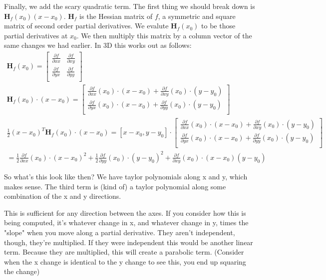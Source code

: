 \documentclass[12pt, letterpaper]{article}
\begin{document}
Finally, we add the scary quadratic term. The first thing we should break down is $\mathbf{H}_f(x_0)(x-x_0)$. $\mathbf{H}_f$ is the Hessian matrix of $f$, a symmetric and square matrix of second order partial derivatives.
We evalute $\mathbf{H}_f(x_0)$ to be those partial derivatives at $x_0$. We then multiply this matrix by a column vector of the same changes we had earlier. In 3D this works out as follows:
\begin{gather*}
    \mathbf{H}_f(x_0) = \begin{bmatrix}
        \frac{\partial f}{\partial xx} & \frac{\partial f}{\partial xy}\\
        \frac{\partial f}{\partial yx} & \frac{\partial f}{\partial yy}\\
    \end{bmatrix}\\
    \mathbf{H}_f(x_0) \cdot (x - x_0) = \begin{bmatrix}
        \frac{\partial f}{\partial xx}(x_0) \cdot (x - x_0) + \frac{\partial f}{\partial xy}(x_0) \cdot (y-y_0)\\
        \frac{\partial f}{\partial yx}(x_0) \cdot (x - x_0) + \frac{\partial f}{\partial yy}(x_0) \cdot (y-y_0)\\ 
    \end{bmatrix}\\
    \frac{1}{2}(x-x_0)^T\mathbf{H}_f(x_0) \cdot (x - x_0) = 
    [x-x_0, y-y_0] \cdot \begin{bmatrix}
        \frac{\partial f}{\partial xx}(x_0) \cdot (x - x_0) + \frac{\partial f}{\partial xy}(x_0) \cdot (y-y_0)\\
        \frac{\partial f}{\partial yx}(x_0) \cdot (x - x_0) + \frac{\partial f}{\partial yy}(x_0) \cdot (y-y_0)\\ 
    \end{bmatrix}\\
    = \frac{1}{2}\frac{\partial f}{\partial xx}(x_0) \cdot (x-x_0)^2 + \frac{1}{2}\frac{\partial f}{\partial yy}(x_0) \cdot (y-y_0)^2 + \frac{\partial f}{\partial xy}(x_0) \cdot (x-x_0)(y-y_0)
\end{gather*}

So what's this look like then? We have taylor polynomials along x and y, which makes sense. The third term is (kind of) a taylor polynomial along some combination of the x and y directions.

This is sufficient for any direction between the axes. If you consider how this is being computed, it's whatever change in x, and whatever change in y, times the "slope" when you move along a partial derivative. They aren't independent, though, they're multiplied. If they were independent this would be another linear term. Because they are multiplied, this will create a parabolic term. (Consider when the x change is identical to the y change to see this, you end up squaring the change)
\end{document}
